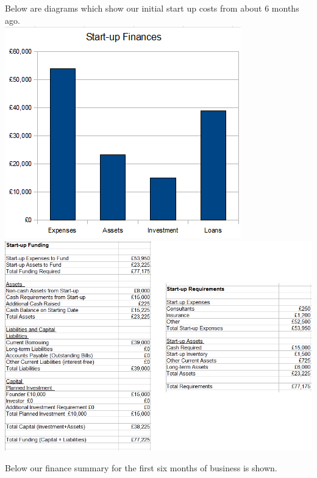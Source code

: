 \documentclass{article}
\begin{document}
Below are diagrams which show our initial start up costs from about 6 months ago. \\

\includegraphics[scale=0.7]{startupFinance.png} \\
\includegraphics[scale=0.5]{startupFinanceData.png}

Below our finance summary for the first six months of business is shown.
\end{document}
